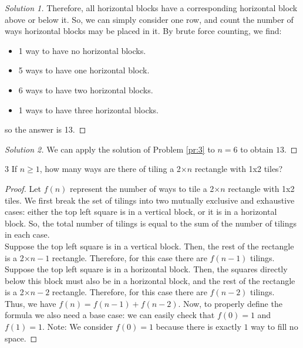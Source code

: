 \documentclass[12pt]{article}
\begin{document}
\begin{myprob}{}{}
\begin{proof}[Solution 1]
            Therefore, all horizontal blocks have a corresponding horizontal block above or below it. So, we can simply consider one row, and count the number of ways horizontal blocks may be placed in it. By brute force counting, we find:
            \begin{itemize}
                \item 1 way to have no horizontal blocks.
                \item 5 ways to have one horizontal block.
                \item 6 ways to have two horizontal blocks.
                \item 1 ways to have three horizontal blocks.
            \end{itemize}
            so the answer is 13.
        \end{proof}

        \begin{proof}[Solution 2]
            We can apply the solution of Problem \ref{pr:3} to $n=6$ to obtain $13$.
        \end{proof}
    \end{myprob}

    \begin{myprob}{}{3}
        If $n\geq1$, how many ways are there of tiling a 2$\times n$ rectangle with 1x2 tiles?

        \begin{proof}
            Let $f(n)$ represent the number of ways to tile a 2$\times n$ rectangle with 1x2 tiles. We first break the set of tilings into two mutually exclusive and exhaustive cases: either the top left square is in a vertical block, or it is in a horizontal block. So, the total number of tilings is equal to the sum of the number of tilings in each case.\\

            Suppose the top left square is in a vertical block. Then, the rest of the rectangle is a 2$\times n-1$ rectangle. Therefore, for this case there are $f(n-1)$ tilings.\\

            Suppose the top left square is in a horizontal block. Then, the squares directly below this block must also be in a horizontal block, and the rest of the rectangle is a 2$\times n-2$ rectangle. Therefore, for this case there are $f(n-2)$ tilings.\\

            Thus, we have $f(n)=f(n-1)+f(n-2)$. Now, to properly define the formula we also need a base case: we can easily check that $f(0)=1$ and $f(1)=1$. Note: We consider $f(0)=1$ because there is exactly $1$ way to fill no space.
        \end{proof}
    \end{myprob}
\end{document}
